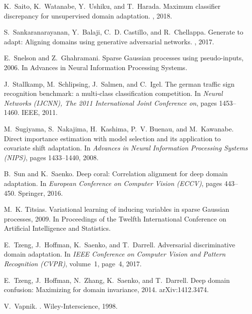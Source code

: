 \documentclass[10pt,letterpaper]{article}
\begin{document}
\begin{thebibliography}{10}
K.~Saito, K.~Watanabe, Y.~Ushiku, and T.~Harada.
\newblock Maximum classifier discrepancy for unsupervised domain adaptation.
, 2018.

S.~Sankaranarayanan, Y.~Balaji, C.~D. Castillo, and R.~Chellappa.
\newblock Generate to adapt: Aligning domains using generative adversarial
  networks.
, 2017.

E.~Snelson and Z.~Ghahramani.
\newblock Sparse {G}aussian processes using pseudo-inputs, 2006.
\newblock In Advances in Neural Information Processing Systems.

J.~Stallkamp, M.~Schlipsing, J.~Salmen, and C.~Igel.
\newblock The german traffic sign recognition benchmark: a multi-class
  classification competition.
\newblock In {\em Neural Networks (IJCNN), The 2011 International Joint
  Conference on}, pages 1453--1460. IEEE, 2011.

M.~Sugiyama, S.~Nakajima, H.~Kashima, P.~V. Buenau, and M.~Kawanabe.
\newblock Direct importance estimation with model selection and its application
  to covariate shift adaptation.
\newblock In {\em Advances in Neural Information Processing Systems (NIPS)},
  pages 1433--1440, 2008.

B.~Sun and K.~Saenko.
\newblock Deep coral: Correlation alignment for deep domain adaptation.
\newblock In {\em European Conference on Computer Vision (ECCV)}, pages
  443--450. Springer, 2016.

M.~K. Titsias.
\newblock Variational learning of inducing variables in sparse {G}aussian
  processes, 2009.
\newblock In Proceedings of the Twelfth International Conference on Artificial
  Intelligence and Statistics.

E.~Tzeng, J.~Hoffman, K.~Saenko, and T.~Darrell.
\newblock Adversarial discriminative domain adaptation.
\newblock In {\em IEEE Conference on Computer Vision and Pattern Recognition
  (CVPR)}, volume~1, page~4, 2017.

E.~Tzeng, J.~Hoffman, N.~Zhang, K.~Saenko, and T.~Darrell.
\newblock Deep domain confusion: {M}aximizing for domain invariance, 2014.
\newblock arXiv:1412.3474.

V.~Vapnik.
.
\newblock Wiley-Interscience, 1998.


\end{thebibliography}
\end{document}
